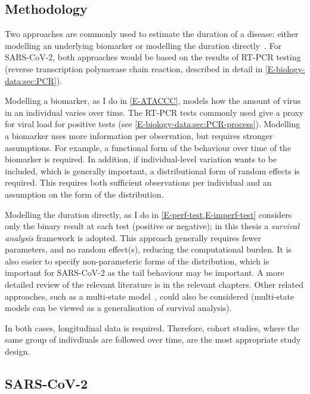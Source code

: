 \documentclass[thesis.tex]{subfiles}
\begin{document}

\subsection{Methodology}

Two approaches are commonly used to estimate the duration of a disease: either modelling an underlying biomarker or modelling the duration directly~\autocite{sweetingEstimating}.
For SARS-CoV-2, both approaches would be based on the results of RT-PCR testing (reverse transcription polymerase chain reaction, described in detail in \cref{E-biology-data:sec:PCR}).

Modelling a biomarker, as I do in \cref{E-ATACCC}, models how the amount of virus in an individual varies over time.
The RT-PCR tests commonly used give a proxy for viral load for positive tests (see \cref{E-biology-data:sec:PCR-process}).
Modelling a biomarker uses more information per observation, but requires stronger assumptions.
For example, a functional form of the behaviour over time of the biomarker is required.
In addition, if individual-level variation wants to be included, which is generally important, a distributional form of random effects is required.
This requires both sufficient observations per individual and an assumption on the form of the distribution.

Modelling the duration directly, as I do in \cref{E-perf-test,E-imperf-test} considers only the binary result at each test (positive or negative); in this thesis a \emph{survival analysis} framework is adopted.
This approach generally requires fewer parameters, and no random effect(s), reducing the computational burden.
It is also easier to specify non-parameteric forms of the distribution, which is important for SARS-CoV-2 as the tail behaviour may be important.
A more detailed review of the relevant literature is in the relevant chapters.
Other related approaches, such as a multi-state model~\autocite{jacksonMSM}, could also be considered (multi-state models can be viewed as a generalisation of survival analysis).

In both cases, longitudinal data is required.
Therefore, cohort studies, where the same group of indivdiuals are followed over time, are the most appropriate study design.

\subsection{SARS-CoV-2} \label{intro:sec:duration-SARS-CoV-2}
\end{document}
